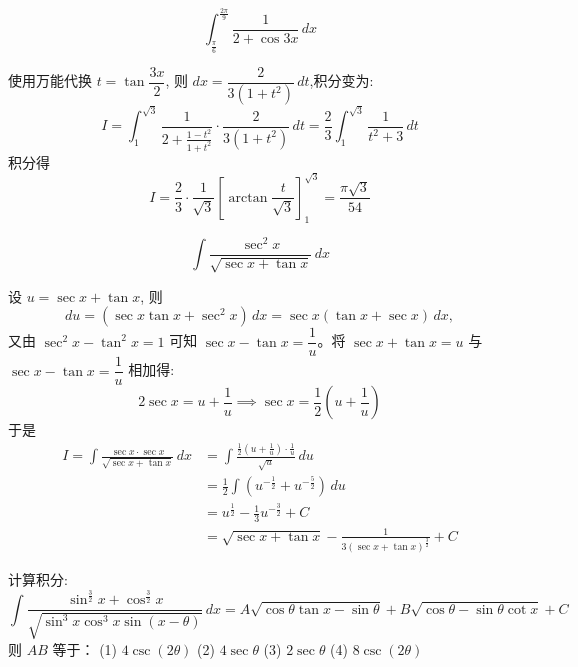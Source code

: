 \begin{questions}
    \question
    \[
    \int_{\frac{\pi}{6}}^{\frac{2\pi}{9}} \frac{1}{2 + \cos 3x} \,dx
    \]
    \begin{solution}
        使用万能代换 $t = \tan \dfrac{3x}{2}$, 则 $dx = \dfrac{2}{3(1+t^2)} \,dt$,积分变为:
        \[
        I = \int_{1}^{\sqrt{3}} \frac{1}{2 + \frac{1-t^2}{1+t^2}} \cdot \frac{2}{3(1+t^2)} \,dt = \frac{2}{3} \int_{1}^{\sqrt{3}} \frac{1}{t^2+3} \,dt
        \]
        积分得
        \[
        I = \frac{2}{3} \cdot \frac{1}{\sqrt{3}} \left[ \arctan \frac{t}{\sqrt{3}} \right]_{1}^{\sqrt{3}} = \frac{\pi\sqrt{3}}{54}
        \]
    \end{solution}

    \question
    \[
    \int \frac{\sec^2 x}{\sqrt{\sec x+\tan x}} \,dx
    \]
    \begin{solution}
        设 $u = \sec x + \tan x$, 则 
        \[
        du = (\sec x \tan x + \sec^2 x) \,dx = \sec x(\tan x + \sec x) \,dx,
        \]
        又由 $\sec^2 x - \tan^2 x = 1$ 可知 $\sec x - \tan x = \dfrac{1}{u}$。将 $\sec x + \tan x = u$ 与 $\sec x - \tan x = \dfrac{1}{u}$ 相加得:
        \[
        2\sec x = u + \frac{1}{u} \implies \sec x = \frac{1}{2} \left( u + \frac{1}{u} \right)
        \]
        于是
        \begin{align*}
        I = \int \frac{\sec x \cdot \sec x}{\sqrt{\sec x + \tan x}} \,dx 
        &= \int \frac{\frac{1}{2} \left( u + \frac{1}{u} \right) \cdot \frac{1}{u}}{\sqrt{u}} \,du \\
        &= \frac{1}{2} \int \left( u^{-\frac{1}{2}} + u^{-\frac{5}{2}} \right) \,du \\
        &= u^{\frac{1}{2}} - \frac{1}{3}u^{-\frac{3}{2}} + C \\
        &= \sqrt{\sec x + \tan x} - \frac{1}{3(\sec x + \tan x)^{\frac{3}{2}}} + C
        \end{align*}
    \end{solution}

    \question
计算积分:
\[
\int \frac{\sin^{\frac{3}{2}} x + \cos^{\frac{3}{2}} x}{\sqrt{\sin^3 x \cos^3 x \sin(x-\theta)}} \,dx = A\sqrt{\cos \theta \tan x - \sin \theta} + B\sqrt{\cos \theta - \sin \theta \cot x} + C
\]
则 $AB$ 等于：
(1) $4 \csc (2\theta)$ \quad (2) $4 \sec \theta$ \quad (3) $2 \sec \theta$ \quad (4) $8 \csc (2\theta)$


\end{questions}
